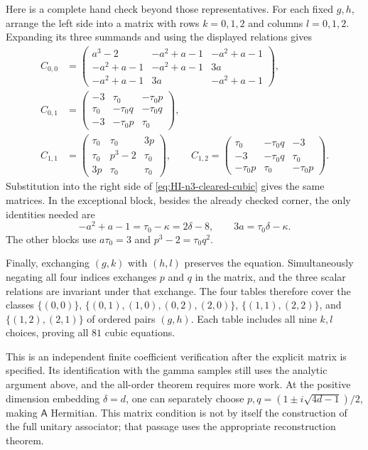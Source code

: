 \begin{example}
Here is a complete hand check beyond those representatives.
For each fixed $g,h$, arrange the left side into a matrix with
rows $k=0,1,2$ and columns $l=0,1,2$. Expanding its three
summands and using the displayed relations gives
\[
 \begin{aligned}
 C_{0,0}&=\begin{pmatrix}
 a^3-2&-a^2+a-1&-a^2+a-1\\
 -a^2+a-1&-a^2+a-1&3a\\
 -a^2+a-1&3a&-a^2+a-1
 \end{pmatrix},\\[3pt]
 C_{0,1}&=\begin{pmatrix}
 -3&\tau_0&-\tau_0p\\
 \tau_0&-\tau_0q&-\tau_0q\\
 -3&-\tau_0p&\tau_0
 \end{pmatrix},\\[3pt]
 C_{1,1}&=\begin{pmatrix}
 \tau_0&\tau_0&3p\\
 \tau_0&p^3-2&\tau_0\\
 3p&\tau_0&\tau_0
 \end{pmatrix},\qquad
 C_{1,2}=\begin{pmatrix}
 \tau_0&-\tau_0q&-3\\
 -3&-\tau_0q&\tau_0\\
 -\tau_0p&\tau_0&-\tau_0p
 \end{pmatrix}.
 \end{aligned}
\]
Substitution into the right side of
\eqref{eq:HI-n3-cleared-cubic} gives the same matrices.
In the exceptional block, besides the already checked corner,
the only identities needed are
\[
 -a^2+a-1=\tau_0-\kappa=2\delta-8,
 \qquad 3a=\tau_0\delta-\kappa.
\]
The other blocks use $a\tau_0=3$ and
$p^3-2=\tau_0q^2$.

Finally, exchanging $(g,k)$ with $(h,l)$ preserves the equation.
Simultaneously negating all four indices exchanges $p$ and $q$
in the matrix, and the three scalar relations are invariant under
that exchange. The four tables therefore cover the classes
$\{(0,0)\}$,
$\{(0,1),(1,0),(0,2),(2,0)\}$,
$\{(1,1),(2,2)\}$, and $\{(1,2),(2,1)\}$ of ordered pairs
$(g,h)$. Each table includes all nine $k,l$ choices, proving
all $81$ cubic equations.

This is an independent finite coefficient verification after
the explicit matrix is specified. Its identification with the
gamma samples still uses the analytic argument above, and the
all-order theorem requires more work. At the positive dimension
embedding $\delta=d$, one can separately choose
$p,q=(1\pm i\sqrt{4d-1})/2$, making $\mathsf A$ Hermitian.
This matrix condition is not by itself the construction of the
full unitary associator; that passage uses the appropriate
reconstruction theorem.
\end{example}

